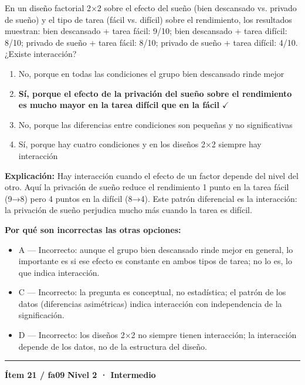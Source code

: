 \documentclass[12pt,a4paper]{article}
\begin{document}
En un diseño factorial 2×2 sobre el efecto del sueño (bien descansado vs. privado de sueño) y el tipo de tarea (fácil vs. difícil) sobre el rendimiento, los resultados muestran: bien descansado + tarea fácil: 9/10; bien descansado + tarea difícil: 8/10; privado de sueño + tarea fácil: 8/10; privado de sueño + tarea difícil: 4/10. ¿Existe interacción?

\begin{enumerate}
  \item[A.] No, porque en todas las condiciones el grupo bien descansado rinde mejor
  \item[\textbf{\color{verde}B.}] \textbf{\color{verde} Sí, porque el efecto de la privación del sueño sobre el rendimiento es mucho mayor en la tarea difícil que en la fácil} \hfill $\checkmark$
  \item[C.] No, porque las diferencias entre condiciones son pequeñas y no significativas
  \item[D.] Sí, porque hay cuatro condiciones y en los diseños 2×2 siempre hay interacción
\end{enumerate}

\noindent\textbf{\color{azul}Explicación:} Hay interacción cuando el efecto de un factor depende del nivel del otro. Aquí la privación de sueño reduce el rendimiento 1 punto en la tarea fácil (9→8) pero 4 puntos en la difícil (8→4). Este patrón diferencial es la interacción: la privación de sueño perjudica mucho más cuando la tarea es difícil.

\noindent\textbf{\color{gris}Por qué son incorrectas las otras opciones:}
\begin{itemize}
  \item {\small A — Incorrecto: aunque el grupo bien descansado rinde mejor en general, lo importante es si ese efecto es constante en ambos tipos de tarea; no lo es, lo que indica interacción.}
  \item {\small C — Incorrecto: la pregunta es conceptual, no estadística; el patrón de los datos (diferencias asimétricas) indica interacción con independencia de la significación.}
  \item {\small D — Incorrecto: los diseños 2×2 no siempre tienen interacción; la interacción depende de los datos, no de la estructura del diseño.}
\end{itemize}
\vspace{8pt}\hrule\vspace{10pt}

\begin{mdframed}[backgroundcolor=fondogris,linecolor=ambar,linewidth=1pt,innerleftmargin=10pt,innerrightmargin=10pt,innertopmargin=7pt,innerbottommargin=7pt]
\textbf{Ítem 21 / fa09} \hfill {\small\bfseries\color{ambar} Nivel 2 · Intermedio}
\end{mdframed}
\end{document}
